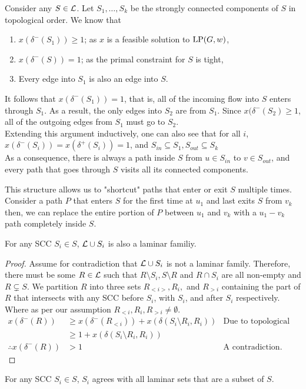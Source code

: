 
	Consider any $S\in \mathcal{L}$. Let $S_1,\dots, S_k$ be the strongly connected components of $S$ in topological order.
	We know that
	\begin{enumerate}
		\item $x(\delta^-(S_1)) \geqslant 1$; as $x$ is a feasible solution to $\textup{LP}(G,w)$,
		\item $x(\delta^-(S)) = 1$; as the primal constraint for $S$ is tight,
		\item Every edge into $S_1$ is also an edge into $S$.
	\end{enumerate}
	It follows that $x(\delta^-(S_1)) = 1$, that is, all of the incoming flow into $S$ enters through $S_1$. As a result, the only edges into $S_2$ are from $S_1$. Since $x(\delta^-(S_2)\geqslant 1$, all of the outgoing edges from $S_1$ must go to $S_2$.
	\\Extending this argument inductively, one can also see that for all $i$, $x(\delta^-(S_i)) = x(\delta^+(S_i)) = 1$, and $S_{in}\subseteq S_1,S_{out}\subseteq S_k$
	\\As a consequence, there is always a path inside $S$ from $u\in S_{in}$ to $v\in S_{out}$, and every path that goes through $S$ visits all its connected components.

	This structure allows us to "shortcut" paths that enter or exit $S$ multiple times. Consider a path $P$ that enters $S$ for the first time at $u_1$ and last exits $S$ from $v_k$ then, we can replace the entire portion of $P$ between $u_1$ and $v_k$ with a $u_1 - v_k$ path completely inside $S$.\\

	\begin{lemma}\label{lemm:2:SiAgree}
		For any SCC $S_i \in S$, $\mathcal{L} \cup S_i$ is also a laminar familiy.
	\end{lemma}
	\begin{proof}
		Assume for contradiction that $\mathcal{L} \cup S_i$ is not a laminar family.
		Therefore, there must be some $R \in \mathcal{L}$ such that $R\setminus S_i, S\setminus R$ and $R \cap S_i$ are all non-empty and $R \subsetneq S$.
		We partition $R$ into three sets $R_{<i>}, R_i,$ and $R_{>i}$ containing the part of $R$ that intersects with any SCC before $S_i$, with $S_i$, and after $S_i$ respectively. Where as per our assumption $R_{<i}, R_i, R_{>i} \ne \emptyset$.
		\begin{align*}
			x(\delta^-(R)) &\geqslant x(\delta^-(R_{<i})) + x(\delta(S_i\setminus R_i, R_i)) & \text{Due to topological order.}\\
			&\geqslant 1 + x(\delta(S_i\setminus R_i, R_i))\\
			\therefore x(\delta^-(R)) &>1 & \text{A contradiction.}
		\end{align*}
	\end{proof}
	\begin{corollary}
		For any SCC $S_i \in S$, $S_i$ agrees with all laminar sets that are a subset of $S$.\\
	\end{corollary}


